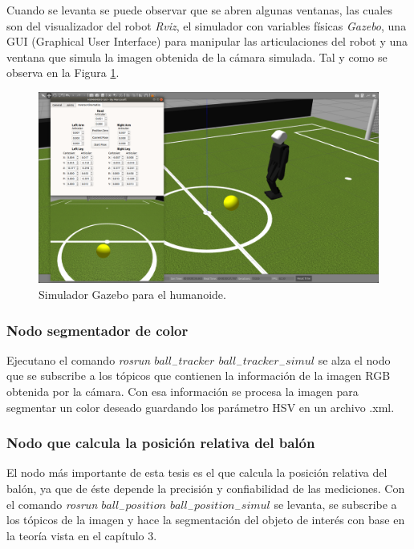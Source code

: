 		Cuando se levanta se puede observar que se abren algunas ventanas, las cuales son del visualizador del robot \textit{Rviz}, el simulador con variables físicas \textit{Gazebo}, una GUI (Graphical User Interface) para manipular las articulaciones del robot y una ventana que simula la imagen obtenida de la cámara simulada. Tal y como se observa en la Figura \ref{fig:gazebo}.
		
\begin{figure}
	\centering
	\includegraphics[scale=0.2]{images/gazebo.png}
	\caption{Simulador Gazebo para el humanoide.}
	\label{fig:gazebo}
\end{figure} 
		
			\subsubsection*{Nodo segmentador de color}
			Ejecutano el comando \textit{rosrun $ball_-tracker$ $ball_-tracker_-simul$} se alza el nodo que se subscribe a los tópicos que contienen la información de la imagen RGB obtenida por la cámara. Con esa información se procesa la imagen para segmentar un color deseado guardando los parámetro HSV en un archivo .xml.
			
			\subsubsection*{Nodo que calcula la posición relativa del balón}
			El nodo más importante de esta tesis es el que calcula la posición relativa del balón, ya que de éste depende la precisión y confiabilidad de las mediciones. Con el comando \textit{rosrun $ball_-position$ $ball_-position_-simul$} se levanta, se subscribe a los tópicos de la imagen y hace la segmentación del objeto de interés con base en la teoría vista en el capítulo 3. 
			
